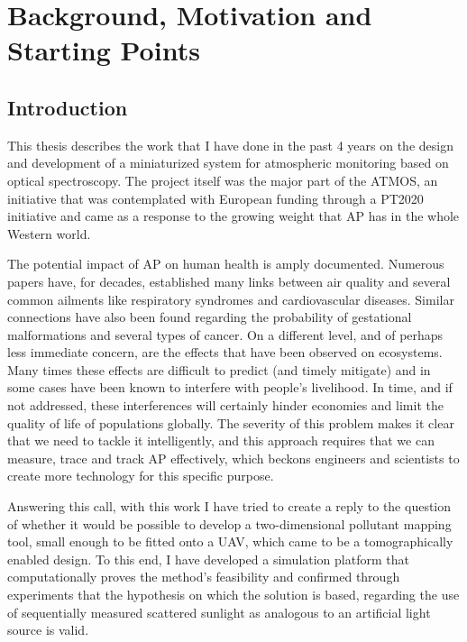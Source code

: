 


\section{Background, Motivation and Starting Points}%
\label{sec:background_and_motivation}

\subsection{Introduction}%
\label{sub:introduction}

This thesis describes the work that I have done in the past 4 years on
the design and development of a miniaturized system for atmospheric
monitoring based on optical spectroscopy. The project itself was the
major part of the \gls{ATMOS}, an initiative that was
contemplated with European funding through a \gls{PT2020} initiative and
came as a response to the growing weight that \gls{AP} has in the whole
Western world.

The potential impact of \gls{AP} on human health is amply documented.
Numerous papers have, for decades, established many links between air
quality and several common ailments like respiratory syndromes and
cardiovascular diseases. Similar connections have also been found
regarding the probability of gestational malformations and several types
of cancer. On a different level, and of perhaps less immediate concern,
are the effects that have been observed on ecosystems. Many times these
effects are difficult to predict (and timely mitigate) and in some cases
have been known to interfere with people's livelihood. In time, and if
not addressed, these interferences will certainly hinder economies and
limit the quality of life of populations globally. The severity of this
problem makes it clear that we need to tackle it intelligently, and this
approach requires that we can measure, trace and track \gls{AP}
effectively, which beckons engineers and scientists to create more
technology for this specific purpose.

Answering this call, with this work I have tried to create a reply to
the question of whether it would be possible to develop a
two-dimensional pollutant mapping tool, small enough to be fitted onto a
\gls{UAV}, which came to be a tomographically enabled design. To this
end, I have developed a simulation platform that computationally proves
the method's feasibility and confirmed through experiments that the
hypothesis on which the solution is based, regarding the use of
sequentially measured scattered sunlight as analogous to an artificial
light source is valid.

